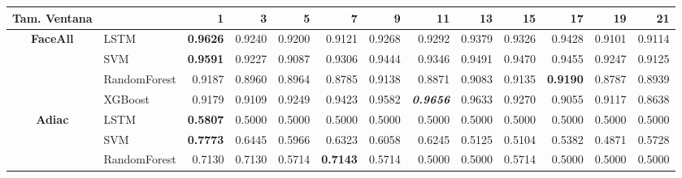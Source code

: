 \begin{table}[H]
	\centering
	\begin{adjustbox}{max width=14cm}
		\begin{tabular}{|c|l|r|r|r|r|r|r|r|r|r|r|r|}
			\hline
			\textbf{Tam. Ventana} &              & 1                        & 3               & 5                        & 7                        & 9               & 11                       & 13     & 15     & 17                       & 19              & 21              \\
			\hline
			\textbf{FaceAll}      & LSTM         & \textbf{0.9626}          & 0.9240          & 0.9200                   & 0.9121                   & 0.9268          & 0.9292                   & 0.9379 & 0.9326 & 0.9428                   & 0.9101          & 0.9114          \\
			                      & SVM          & \textbf{0.9591}          & 0.9227          & 0.9087                   & 0.9306                   & 0.9444          & 0.9346                   & 0.9491 & 0.9470 & 0.9455                   & 0.9247          & 0.9125          \\
			                      & RandomForest & 0.9187                   & 0.8960          & 0.8964                   & 0.8785                   & 0.9138          & 0.8871                   & 0.9083 & 0.9135 & \textbf{0.9190}          & 0.8787          & 0.8939          \\
			                      & XGBoost      & 0.9179                   & 0.9109          & 0.9249                   & 0.9423                   & 0.9582          & \textit{\textbf{0.9656}} & 0.9633 & 0.9270 & 0.9055                   & 0.9117          & 0.8638          \\
			\hline
			\textbf{Adiac}        & LSTM         & \textbf{0.5807}          & 0.5000          & 0.5000                   & 0.5000                   & 0.5000          & 0.5000                   & 0.5000 & 0.5000 & 0.5000                   & 0.5000          & 0.5000          \\
			                      & SVM          & \textbf{0.7773}          & 0.6445          & 0.5966                   & 0.6323                   & 0.6058          & 0.6245                   & 0.5125 & 0.5104 & 0.5382                   & 0.4871          & 0.5728          \\
			                      & RandomForest & 0.7130                   & 0.7130          & 0.5714                   & \textbf{0.7143}          & 0.5714          & 0.5000                   & 0.5000 & 0.5714 & 0.5000                   & 0.5000          & 0.5000          \\

\end{tabular}
\end{adjustbox}
\end{table}
